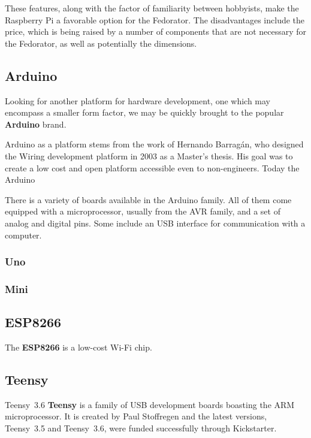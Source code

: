             These features, along with the factor of familiarity between hobbyists, make the Raspberry Pi a favorable option for the Fedorator.  The disadvantages include the price, which is being raised by a number of components that are not necessary for the Fedorator, as well as potentially the dimensions.
        \subsection{Arduino}
            Looking for another platform for hardware development, one which may encompass a smaller form factor, we may be quickly brought to the popular \textbf{Arduino} brand.
            
            Arduino as a platform stems from the work of Hernando Barragán, who designed the Wiring development platform in 2003 as a Master's thesis.  His goal was to create a low cost and open platform accessible even to non-engineers\cite{arduino-untold-history}.  Today the Arduino \todo{}
            
            There is a variety of boards available in the Arduino family\cite{arduino-products}.  All of them come equipped with a microprocessor, usually from the AVR family, and a set of analog and digital pins.  Some include an USB interface for communication with a computer.
            
            \subsubsection{Uno}
            
            \subsubsection{Mini}
            
        \subsection{ESP8266}
            The \textbf{ESP8266} is a low-cost Wi-Fi chip.  
            
        \subsection{Teensy}
                {Teensy~3.6 \cite{teensy-36-sparkfun}}
            \textbf{Teensy} is a family of USB development boards boasting the ARM microprocessor.  It is created by Paul Stoffregen and the latest versions, Teensy~3.5 and Teensy~3.6, were funded successfully through Kickstarter\cite{teensy-35-36-kickstarter}.
            
